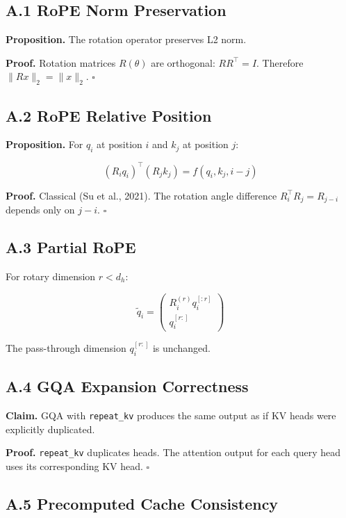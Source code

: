 {\subsection{A.1 RoPE Norm Preservation}

\textbf{Proposition.} The rotation operator preserves L2 norm.

\textbf{Proof.} Rotation matrices $R(\theta)$ are orthogonal: $R R^\top = I$. 
Therefore $\|R x\|_2 = \|x\|_2$. $\square$

\subsection{A.2 RoPE Relative Position}

\textbf{Proposition.} For $q_i$ at position $i$ and $k_j$ at position $j$:

\[
(R_i q_i)^\top (R_j k_j) = f(q_i, k_j, i - j)
\tag{A.1}
\]

\textbf{Proof.} Classical (Su et al., 2021). The rotation angle difference 
$R_i^\top R_j = R_{j-i}$ depends only on $j - i$. $\square$

\subsection{A.3 Partial RoPE}

For rotary dimension $r < d_h$:

\[
\tilde{q}_i = \begin{pmatrix} R_i^{(r)} q_i^{[:r]} \\ q_i^{[r:]} \end{pmatrix}
\tag{A.2}
\]

The pass-through dimension $q_i^{[r:]}$ is unchanged.

\subsection{A.4 GQA Expansion Correctness}

\textbf{Claim.} GQA with \texttt{repeat\_kv} produces the same output as if KV heads 
were explicitly duplicated.

\textbf{Proof.} \texttt{repeat\_kv} duplicates heads. The attention output for each 
query head uses its corresponding KV head. $\square$

\subsection{A.5 Precomputed Cache Consistency}

}

